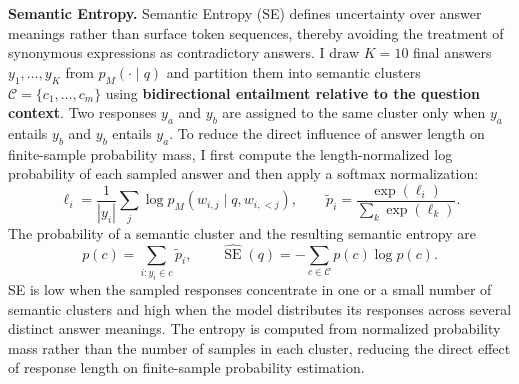 \textbf{Semantic Entropy.} Semantic Entropy (SE) defines uncertainty over answer meanings rather than surface token sequences, thereby avoiding the treatment of synonymous expressions as contradictory answers. I draw $K=10$ final answers $y_1,\ldots,y_K$ from $p_M(\cdot\mid q)$ and partition them into semantic clusters $\mathcal C=\{c_1,\ldots,c_m\}$ using \textbf{bidirectional entailment relative to the question context}. Two responses $y_a$ and $y_b$ are assigned to the same cluster only when $y_a$ entails $y_b$ and $y_b$ entails $y_a$. To reduce the direct influence of answer length on finite-sample probability mass, I first compute the length-normalized log probability of each sampled answer and then apply a softmax normalization:
\[
\ell_i=\frac{1}{|y_i|}\sum_j\log p_M(w_{i,j}\mid q,w_{i,<j}),
\qquad
\tilde p_i=\frac{\exp(\ell_i)}{\sum_k\exp(\ell_k)}.
\]
The probability of a semantic cluster and the resulting semantic entropy are
\[
p(c)=\sum_{i:y_i\in c}\tilde p_i,
\qquad
\widehat{\operatorname{SE}}(q)=-\sum_{c\in\mathcal C}p(c)\log p(c).
\]
SE is low when the sampled responses concentrate in one or a small number of semantic clusters and high when the model distributes its responses across several distinct answer meanings. The entropy is computed from normalized probability mass rather than the number of samples in each cluster, reducing the direct effect of response length on finite-sample probability estimation.

